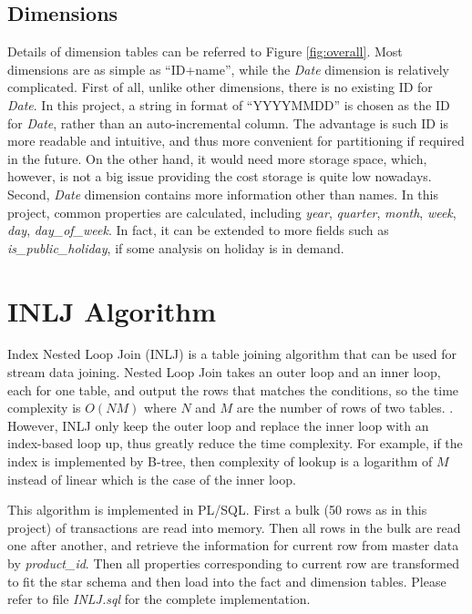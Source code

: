 \documentclass[
  a4paper,
]{article}
\begin{document}
\hypertarget{dimensions}{%
\subsection{Dimensions}\label{dimensions}}

Details of dimension tables can be referred to Figure \ref{fig:overall}.
Most dimensions are as simple as ``ID+name'', while the \emph{Date}
dimension is relatively complicated. First of all, unlike other
dimensions, there is no existing ID for \emph{Date}. In this project, a
string in format of ``YYYYMMDD'' is chosen as the ID for \emph{Date},
rather than an auto-incremental column. The advantage is such ID is more
readable and intuitive, and thus more convenient for partitioning if
required in the future. On the other hand, it would need more storage
space, which, however, is not a big issue providing the cost storage is
quite low nowadays. Second, \emph{Date} dimension contains more
information other than names. In this project, common properties are
calculated, including \emph{year}, \emph{quarter}, \emph{month},
\emph{week}, \emph{day}, \emph{day\_of\_week}. In fact, it can be
extended to more fields such as \emph{is\_public\_holiday}, if some
analysis on holiday is in demand.

\hypertarget{inlj-algorithm}{%
\section{INLJ Algorithm}\label{inlj-algorithm}}

Index Nested Loop Join (INLJ) is a table joining algorithm that can be
used for stream data joining. Nested Loop Join takes an outer loop and
an inner loop, each for one table, and output the rows that matches the
conditions, so the time complexity is \(O(N M)\) where \(N\) and \(M\)
are the number of rows of two tables. . However, INLJ only keep the
outer loop and replace the inner loop with an index-based loop up, thus
greatly reduce the time complexity. For example, if the index is
implemented by B-tree, then complexity of lookup is a logarithm of \(M\)
instead of linear which is the case of the inner loop.

This algorithm is implemented in PL/SQL. First a bulk (50 rows as in
this project) of transactions are read into memory. Then all rows in the
bulk are read one after another, and retrieve the information for
current row from master data by \emph{product\_id}. Then all properties
corresponding to current row are transformed to fit the star schema and
then load into the fact and dimension tables. Please refer to file
\emph{INLJ.sql} for the complete implementation.
\end{document}
